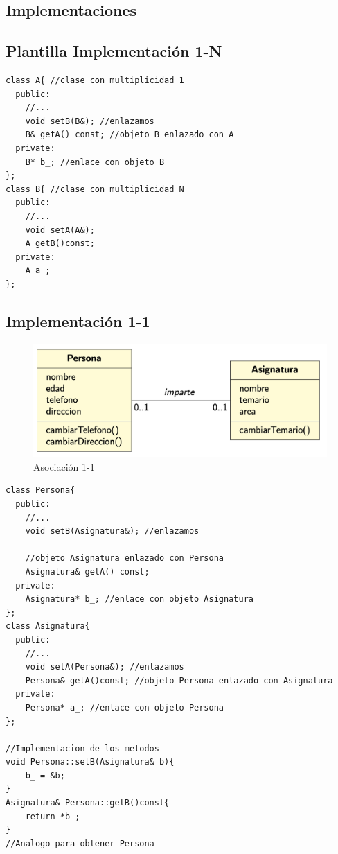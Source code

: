 \subsection{Implementaciones}
\begin{itemize}
\subsection{Plantilla Implementación 1-N}

\begin{lstlisting}[frame=single]
class A{ //clase con multiplicidad 1
  public:
    //...
    void setB(B&); //enlazamos
    B& getA() const; //objeto B enlazado con A
  private:
    B* b_; //enlace con objeto B
};
class B{ //clase con multiplicidad N
  public:
    //...
    void setA(A&);
    A getB()const;
  private:
    A a_;
};
\end{lstlisting}
\newpage
\subsection{Implementación 1-1}

\begin{figure}[h]
    \centering
	\includegraphics[width=\textwidth]{Imagenes/asociacion1.png}
    \caption{Asociación 1-1}
\end{figure}
\begin{lstlisting}[frame=single]
class Persona{
  public:
    //...
    void setB(Asignatura&); //enlazamos
    
    //objeto Asignatura enlazado con Persona
    Asignatura& getA() const; 
  private:
    Asignatura* b_; //enlace con objeto Asignatura
};
class Asignatura{
  public:
    //...
    void setA(Persona&); //enlazamos
    Persona& getA()const; //objeto Persona enlazado con Asignatura
  private:
    Persona* a_; //enlace con objeto Persona
};

//Implementacion de los metodos
void Persona::setB(Asignatura& b){
    b_ = &b;
}
Asignatura& Persona::getB()const{
    return *b_;
}
//Analogo para obtener Persona
\end{lstlisting}


\end{itemize}
